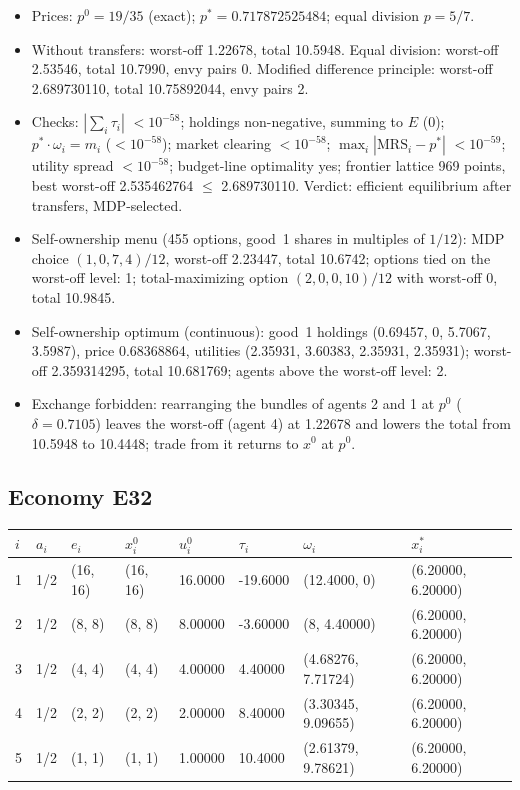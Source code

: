 \begin{itemize}[leftmargin=1.2em,itemsep=0pt,topsep=2pt]\footnotesize
\item Prices: $p^0 = 19/35$ (exact); $p^* = 0.717872525484$; equal division $p = 5/7$.
\item Without transfers: worst-off 1.22678, total 10.5948. Equal division: worst-off 2.53546, total 10.7990, envy pairs 0. Modified difference principle: worst-off 2.689730110, total 10.75892044, envy pairs 2.
\item Checks: $|\sum_i\tau_i|$ $<10^{-58}$; holdings non-negative, summing to $E$ (0); $p^*\cdot\omega_i = m_i$ ($<10^{-58}$); market clearing $<10^{-58}$; $\max_i|\mathrm{MRS}_i - p^*|$ $<10^{-59}$; utility spread $<10^{-58}$; budget-line optimality yes; frontier lattice 969 points, best worst-off 2.535462764 $\leq$ 2.689730110. Verdict: efficient equilibrium after transfers, MDP-selected.
\item Self-ownership menu (455 options, good~1 shares in multiples of $1/12$): MDP choice $(1, 0, 7, 4)/12$, worst-off 2.23447, total 10.6742; options tied on the worst-off level: 1; total-maximizing option $(2, 0, 0, 10)/12$ with worst-off 0, total 10.9845.
\item Self-ownership optimum (continuous): good~1 holdings (0.69457, 0, 5.7067, 3.5987), price 0.68368864, utilities (2.35931, 3.60383, 2.35931, 2.35931); worst-off 2.359314295, total 10.681769; agents above the worst-off level: 2.
\item Exchange forbidden: rearranging the bundles of agents 2 and 1 at $p^0$ ($\delta = 0.7105$) leaves the worst-off (agent 4) at 1.22678 and lowers the total from 10.5948 to 10.4448; trade from it returns to $x^0$ at $p^0$.
\end{itemize}

\subsection*{Economy E32}
\label{ec:E32}
{\scriptsize\setlength{\tabcolsep}{3pt}
\begin{tabular}{@{}llllllll@{}}
\toprule
$i$ & $a_i$ & $e_i$ & $x^0_i$ & $u^0_i$ & $\tau_i$ & $\omega_i$ & $x^*_i$ \\
\midrule
1 & 1/2 & (16, 16) & (16, 16) & 16.0000 & -19.6000 & (12.4000, 0) & (6.20000, 6.20000) \\
2 & 1/2 & (8, 8) & (8, 8) & 8.00000 & -3.60000 & (8, 4.40000) & (6.20000, 6.20000) \\
3 & 1/2 & (4, 4) & (4, 4) & 4.00000 & 4.40000 & (4.68276, 7.71724) & (6.20000, 6.20000) \\
4 & 1/2 & (2, 2) & (2, 2) & 2.00000 & 8.40000 & (3.30345, 9.09655) & (6.20000, 6.20000) \\
5 & 1/2 & (1, 1) & (1, 1) & 1.00000 & 10.4000 & (2.61379, 9.78621) & (6.20000, 6.20000) \\
\bottomrule\end{tabular}}


